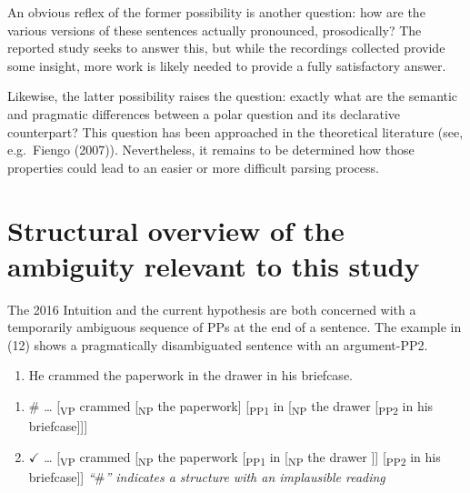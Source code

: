 \documentclass[11pt,oneside]{book}
\providecommand{\tightlist}{%
  \setlength{\itemsep}{0pt}\setlength{\parskip}{0pt}}
\begin{document}
An obvious reflex of the former possibility is another question: how are the various versions of these sentences actually pronounced, prosodically? The reported study seeks to answer this, but while the recordings collected provide some insight, more work is likely needed to provide a fully satisfactory answer.

Likewise, the latter possibility raises the question: exactly what are the semantic and pragmatic differences between a polar question and its declarative counterpart? This question has been approached in the theoretical literature (see, e.g.~Fiengo (2007)). Nevertheless, it remains to be determined how those properties could lead to an easier or more difficult parsing process.

\hypertarget{mech}{%
\section{Structural overview of the ambiguity relevant to this study}\label{mech}}

The 2016 Intuition and the current hypothesis are both concerned with a temporarily ambiguous sequence of PPs at the end of a sentence. The example in (12) shows a pragmatically disambiguated sentence with an argument-PP2.

\begin{enumerate}
\def\labelenumi{(\arabic{enumi})}
\setcounter{enumi}{11}
\tightlist
\item
  He crammed the paperwork in the drawer in his briefcase.
\end{enumerate}

\begin{enumerate}
\def\labelenumi{\alph{enumi})}
\tightlist
\item
  \(\#\) \ldots{} {[}\textsubscript{VP} crammed {[}\textsubscript{NP} the paperwork{]} {[}\textsubscript{PP1} in {[}\textsubscript{NP} the drawer {[}\textsubscript{PP2} in his briefcase{]}{]}{]}
\item
  \(\checkmark\) \ldots{} {[}\textsubscript{VP} crammed {[}\textsubscript{NP} the paperwork {[}\textsubscript{PP1} in {[}\textsubscript{NP} the drawer {]}{]} {[}\textsubscript{PP2} in his briefcase{]}{]} \linebreak\nopagebreak
  \emph{``\(\#\)'' indicates a structure with an implausible reading}
\end{enumerate}
\end{document}
